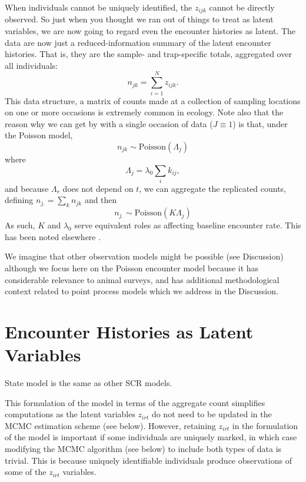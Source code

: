 When individuals cannot be uniquely identified, the $z_{ijk}$ cannot
be directly observed. So just when you thought we ran out of things to
treat as latent variables, we are now going to regard even the encounter
histories as latent. The data are now just a reduced-information
summary of the latent encounter histories. That is, they are the
sample- and trap-specific totals, aggregated over all individuals:
\[
n_{jk} = \sum_{i=1}^{N} z_{ijk}.
\]
This data structure, a matrix of counts made at a collection of
sampling locations on one or more occasions is extremely common in
ecology. Note also that the reason why we can get by with a single
occasion of data ($J \equiv 1$) is that, under the Poisson model,
\begin{equation}
n_{jk} \sim \mbox{Poisson}( \Lambda_{j} )
\label{eq:nagg}
\end{equation}
where
\[
 \Lambda_{j} = \lambda_0 \sum_{i} k_{ij},
\]
and because $\Lambda_r$ does not depend on $t$, we can
aggregate the replicated counts, defining
$n_{j.} = \sum_{k} n_{jk}$ and then
\[
 n_{j.} \sim \mbox{Poisson}( K \Lambda_{j} )
\]
As such, $K$ and $\lambda_{0}$ serve equivalent roles as affecting
baseline encounter rate. This has been noted elsewhere
\citep{efford_etal:2009}.


We imagine that other observation models
might be possible (see Discussion) although we focus here on the
Poisson encounter model because it has considerable relevance to
animal surveys, and has additional methodological context related to
point process models which we address in the Discussion.




\section{Encounter Histories as Latent Variables}




State model is the same as other SCR models.


This formulation of the model in terms of the aggregate count
simplifies computations as the latent variables
$z_{irt}$ do not need to be updated in the MCMC estimation
scheme (see below). However, retaining $z_{irt}$
in the formulation of the model
is important if some individuals are uniquely marked, in which case
modifying
the MCMC algorithm (see below) to include both types of data is
trivial. This is because uniquely identifiable individuals produce
observations of some of the $z_{irt}$ variables.




